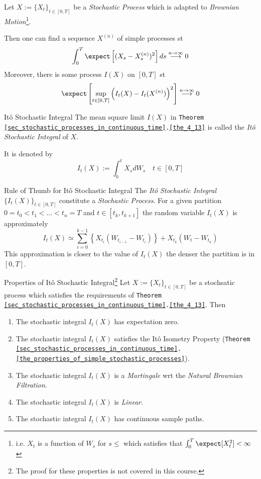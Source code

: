 \documentclass[11pt,a4paper]{article}
\begin{document}
  \begin{theorem}{}\label{the_4_13}
    Let $X:=\{X_t\}_{t\in[0,T]}$ be a \textit{Stochastic Process} which is adapted to \textit{Brownian Motion}\footnote{i.e. $X_t$ is a function of $W_s$ for $s\leq$ which satisfies that $\int_0^T\expect[X_t^2]<\infty$}.
    \par Then one can find a sequence $X^{(n)}$ of simple processes st
    \[ \int_0^T\expect\left[(X_s-X_s^{(n)})^2\right]ds\overset{n\to\infty}{\longrightarrow}0 \]
    Moreover, there is some process $I(X)$ on $[0,T]$ st
    \[ \expect\left[\sup_{t\in[0,T]}\left(I_t(X)-I_t(X^{(n)})\right)^2\right]\overset{n\to\infty}{\longrightarrow}0 \]
  \end{theorem}

  \begin{definition}{It\^o Stochastic Integral}
    The mean square limit $I(X)$ in \texttt{Theorem \ref{sec_stochastic_processes_in_continuous_time}.\ref{the_4_13}} is called the \textit{It\^o Stochastic Integral} of $X$.
    \par It is denoted by
    \[ I_t(X):=\int_0^tX_sdW_s\quad t\in[0,T] \]
  \end{definition}

  \begin{remark}{Rule of Thumb for It\^o Stochastic Integral}
    The \textit{It\^o Stochastic Integral} $\{I_t(X)\}_{t\in[0,T]}$ constitute a \textit{Stochastic Process}. For a given partition $0=t_0<t_1<\dots<t_n=T$ and $t\in[t_k,t_{k+1}]$ the random variable $I_t(X)$ is approximately
    \[ I_t(X)\simeq\sum_{i=0}^{k-1}\left\{X_{t_i}(W_{t_{i-1}}-W_{t_i})\right\}+X_{t_k}(W_t-W_{t_k}) \]
    This approximation is closer to the value of $I_t(X)$ the denser the partition is in $[0,T]$.
  \end{remark}

    \begin{theorem}{Properties of It\^o Stochastic Integral\footnote{The proof for these properties is not covered in this course.}}\label{the_properties_of_ito_stochastic_integral}
      Let $X:=\{X_t\}_{t\in[0,T]}$ be a stochsatic process which satisfies the requirements of \texttt{Theorem \ref{sec_stochastic_processes_in_continuous_time}.\ref{the_4_13}}. Then
      \begin{enumerate}
        \item The stochastic integral $I_t(X)$ has expectation zero.
        \item The stochastic integral $I_t(X)$ satisfies the It\^o Isometry Property (\texttt{Theorem \ref{sec_stochastic_processes_in_continuous_time}.\ref{the_properties_of_simple_stochastic_processes}}).
        \item The stochastic integral $I_t(X)$ is a \textit{Martingale} wrt the \textit{Natural Brownian Filtration}.
        \item The stochastic integral $I_t(X)$ is \textit{Linear}.
        \item The stochastic integral $I_t(X)$ has continuous sample paths.
      \end{enumerate}
    \end{theorem}
\end{document}
